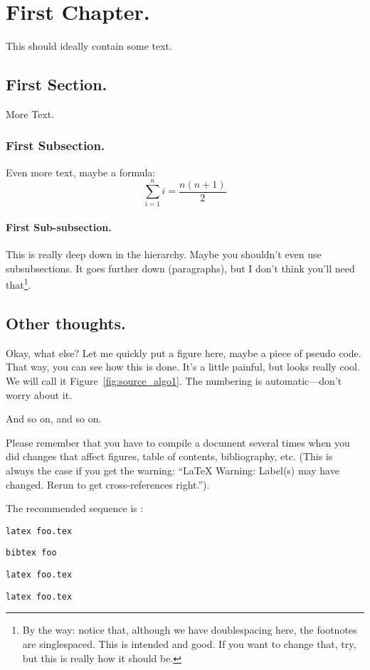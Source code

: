 %
%
\chapter{First Chapter.}
This should ideally contain some text. 
\section{First Section.}
More Text.
\subsection[Alternative title for the Table of Contents]{First Subsection.}
Even more text, maybe a formula:
\begin{equation}
\sum_{i=1}^{n}i=\frac{n(n+1)}{2} %
\end{equation}
\subsubsection{First Sub-subsection.}
This is really deep down in the hierarchy. Maybe you shouldn't even
use sub\-subsections. It goes further down (paragraphs), but I don't
think you'll need that\footnote{By the way: notice that, although we
have doublespacing here, the footnotes are singlespaced. This is
intended and good. If you want to change that, try, but this is really
how it should be.}.

\section{Other thoughts.}
Okay, what else?
Let me quickly put a figure here, maybe a piece of pseudo code.
That way, you can see how this is done. It's a little painful, but
looks really cool. We will call it Figure~\ref{fig:source_algo1}. The
numbering is automatic---don't worry about it.



\noindent
And so on, and so on.

Please remember that you have to compile a document several times when
you did changes that affect figures, table of contents, bibliography,
etc. (This is always the case if you get the warning: ``LaTeX Warning:
Label(s) may have changed. Rerun to get cross-references right.'').

The recommended sequence is :

\texttt{latex foo.tex}

\texttt{bibtex foo}

\texttt{latex foo.tex}

\texttt{latex foo.tex}
